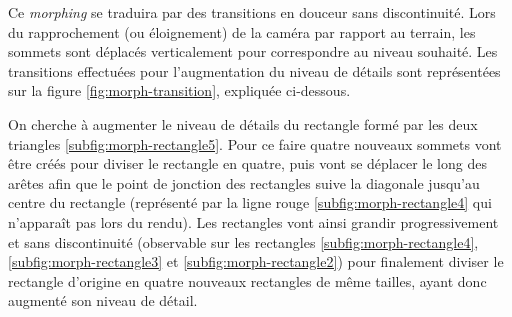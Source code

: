   Ce \emph{morphing} se traduira par des transitions en douceur sans discontinuité. Lors du rapprochement (ou éloignement) de la caméra par rapport au terrain, les sommets sont déplacés verticalement pour correspondre au niveau souhaité. Les transitions effectuées pour l'augmentation du niveau de détails sont représentées sur la figure \ref{fig:morph-transition}, expliquée ci-dessous. 
  
  \newpage
  
  On cherche à augmenter le niveau de détails du rectangle formé par les deux triangles \ref{subfig:morph-rectangle5}. Pour ce faire quatre nouveaux sommets vont être créés pour diviser le rectangle en quatre, puis vont se déplacer le long des arêtes afin que le point de jonction des rectangles suive la diagonale jusqu'au centre du rectangle (représenté par la ligne rouge \ref{subfig:morph-rectangle4} qui n'apparaît pas lors du rendu). Les rectangles vont ainsi grandir progressivement et sans discontinuité (observable sur les rectangles \ref{subfig:morph-rectangle4}, \ref{subfig:morph-rectangle3} et \ref{subfig:morph-rectangle2}) pour finalement diviser le rectangle d'origine en quatre nouveaux rectangles de même tailles, ayant donc augmenté son niveau de détail.\\
  
